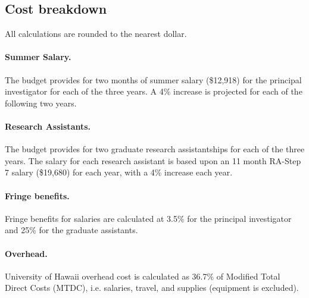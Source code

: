 \subsection*{Cost breakdown}
\label{cost-breakdown}

All calculations are rounded to the nearest dollar.

\paragraph{Summer Salary.}  
The budget provides for two months of summer salary (\$12,918) for the principal investigator for
each of the three years.  A 4\% increase is projected for each of the following two years. 

\paragraph*{Research Assistants.}  
The budget provides for two graduate research assistantships
for each of the three years.  The salary for each research assistant is
based upon an 11 month RA-Step 7 salary (\$19,680) for each year, with a 
4\% increase each year. 

\paragraph*{Fringe benefits.} 
Fringe benefits for salaries are calculated at 3.5\% for the principal
investigator and 25\% for the graduate assistants.

\paragraph*{Overhead.}  
University of Hawaii overhead cost is calculated as 36.7\% of Modified Total
Direct Costs (MTDC), i.e. salaries, travel, and supplies (equipment is
excluded).





